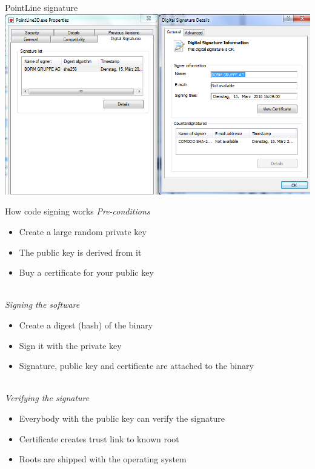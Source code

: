 \documentclass[11pt]{beamer}
\begin{document}
\begin{frame}{PointLine signature}
\includegraphics[scale=0.38]{pointLine_signature.png}
\end{frame}

\begin{frame}{How code signing works}
\emph{Pre-conditions}
\begin{itemize}
\item Create a large random private key
\item The public key is derived from it
\item Buy a certificate for your public key
\end{itemize}
\pause
\\[0.2cm]
\emph{Signing the software}
\begin{itemize}
\item Create a digest (hash) of the binary
\item Sign it with the private key
\item Signature, public key and certificate are attached to the binary
\end{itemize}
\pause
\\[0.2cm]
\emph{Verifying the signature}
\begin{itemize}
\item Everybody with the public key can verify the signature
\item Certificate creates trust link to known root
\item Roots are shipped with the operating system
\end{itemize}
\end{frame}
\end{document}
